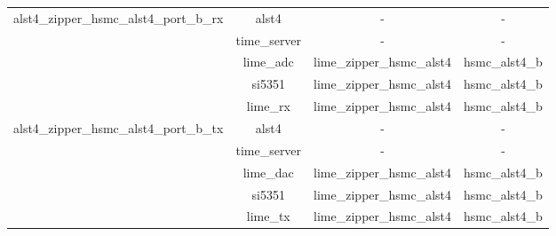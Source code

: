 \documentclass{article}
\def\comp{alst4}
\begin{document}
\begin{tabular}{|c|c|c|c|}
	\hline
	\multirow{5}{*}{alst4\_zipper\_hsmc\_alst4\_port\_b\_rx}&
	\comp & - & - \\ &time\_server & - & - \\ &lime\_adc &
	lime\_zipper\_hsmc\_alst4 & hsmc\_alst4\_b \\  &si5351 &
	lime\_zipper\_hsmc\_alst4 & hsmc\_alst4\_b \\ &lime\_rx &
	lime\_zipper\_hsmc\_alst4 & hsmc\_alst4\_b \\
	\hline
	\multirow{5}{*}{alst4\_zipper\_hsmc\_alst4\_port\_b\_tx}&
	\comp & - & - \\ &time\_server & - & - \\ &lime\_dac &
	lime\_zipper\_hsmc\_alst4 & hsmc\_alst4\_b \\  &si5351 &
	lime\_zipper\_hsmc\_alst4 & hsmc\_alst4\_b \\ &lime\_tx &
	lime\_zipper\_hsmc\_alst4 & hsmc\_alst4\_b \\
	\hline
\end{tabular}

\newpage
\end{document}
